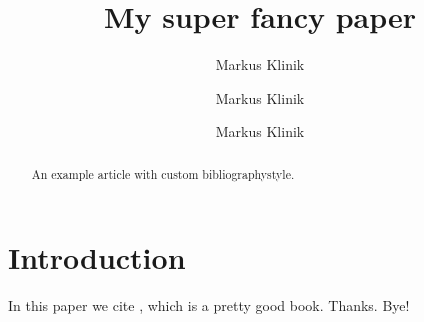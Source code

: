 \documentclass[a4paper]{article}
\title{My super fancy paper}
\author{
       Markus Klinik
  \and Markus Klinik
  \and Markus Klinik
}
\begin{document}
\maketitle

\begin{abstract}
An example article with custom bibliographystyle.
\end{abstract}

\section{Introduction}

In this paper we cite \citet{Nielson1999}, which is a pretty good book.
Thanks. Bye!



\end{document}
